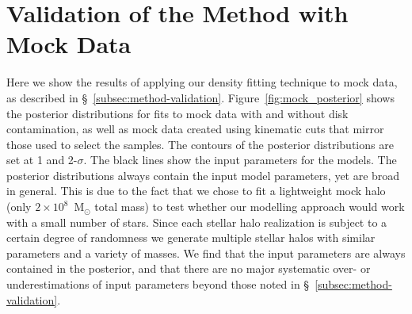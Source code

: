 \section{Validation of the Method with Mock Data}
\label{ap:mock-data}

Here we show the results of applying our density fitting technique to mock data, as described in \S~\ref{subsec:method-validation}. Figure~\ref{fig:mock_posterior} shows the posterior distributions for fits to mock data with and without disk contamination, as well as mock data created using kinematic cuts that mirror those used to select the \gse samples. The contours of the posterior distributions are set at 1 and 2-$\sigma$. The black lines show the input parameters for the models. The posterior distributions always contain the input model parameters, yet are broad in general. This is due to the fact that we chose to fit a lightweight mock halo (only $2\times10^{8}$~M$_{\odot}$ total mass) to test whether our modelling approach would work with a small number of stars. Since each stellar halo realization is subject to a certain degree of randomness we generate multiple stellar halos with similar parameters and a variety of masses. We find that the input parameters are always contained in the posterior, and that there are no major systematic over- or underestimations of input parameters beyond those noted in \S~\ref{subsec:method-validation}.

